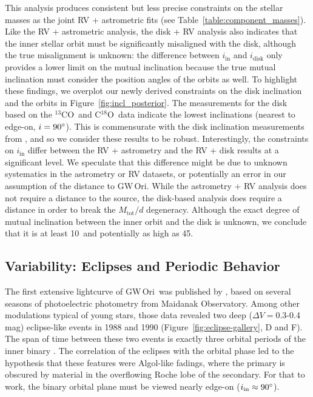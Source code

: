\documentclass[twocolumn]{aastex61}
\newcommand{\obj}{GW\,Ori}
\newcommand{\thirteen}{${}^{13}$CO}
\newcommand{\eighteen}{C${}^{18}$O}
\begin{document}
This analysis produces consistent but less precise constraints on the stellar masses as the joint RV + astrometric fits (see Table~\ref{table:component_masses}). Like the RV + astrometric analysis, the disk + RV analysis also indicates that the inner stellar orbit must be significantly misaligned with the disk, although the true misalignment is unknown: the difference between $i_\mathrm{in}$ and $i_\mathrm{disk}$ only provides a lower limit on the mutual inclination because the true mutual inclination must consider the position angles of the orbits as well. To highlight these findings, we overplot our newly derived constraints on the disk inclination and the orbits in Figure~\ref{fig:incl_posterior}. The measurements for the disk based on the \thirteen\ and \eighteen\ data indicate the lowest inclinations (nearest to edge-on, $i = 90\mbox{$^\circ$}$). This is commensurate with the disk inclination measurements from \citet{fang17}, and so we consider these results to be robust. Interestingly, the constraints on $i_\mathrm{in}$ differ between the RV + astrometry and the RV + disk results at a significant level. We speculate that this difference might be due to unknown systematics in the astrometry or RV datasets, or potentially an error in our assumption of the distance to \obj. While the astrometry + RV analysis does not require a distance to the source, the disk-based analysis does require a distance in order to break the $M_\mathrm{tot} / d$ degeneracy. Although the exact degree of mutual inclination between the inner orbit and the disk is unknown, we conclude that it is at least 10\degr\ and potentially as high as 45\degr.


\subsection{Variability: Eclipses and Periodic Behavior \label{sec:eclipses}}


The first extensive lightcurve of \obj\ was published by \citet{shevchenko92}, based on several seasons of photoelectric photometry from Maidanak Observatory.  Among other modulations typical of young stars, those data revealed two deep ($\Delta V = 0.3$-0.4\,mag) eclipse-like events in 1988 and 1990 (Figure~\ref{fig:eclipse-gallery}, D and F). The span of time between these two events is exactly three orbital periods of the inner binary \citep[the only known orbit at the time;][]{mathieu91}. 
The correlation of the eclipses with the orbital phase led to the hypothesis that these features were Algol-like fadings, where the primary is obscured by material in the overflowing Roche lobe of the secondary. For that to work, the binary orbital plane must be viewed nearly edge-on ($i_\mathrm{in} \approx 90\mbox{$^\circ$}$).  
\end{document}
